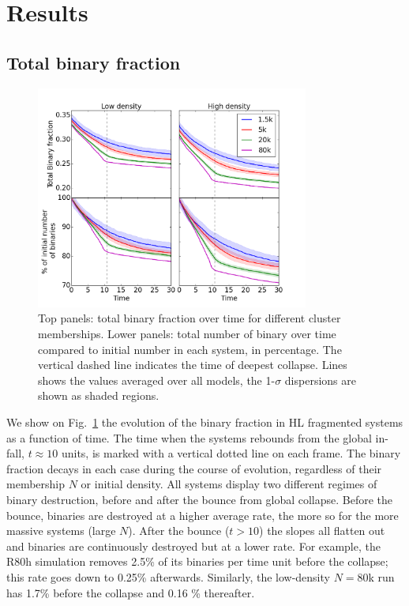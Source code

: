 \section{Results}


\subsection{Total binary fraction}



\begin{figure}
\begin{center}
\includegraphics[width=0.8\textwidth]{Figures/6_TotBinFrac_vs_time_dispersion}
\caption[Evolution of the total binary fraction and percentage of initial population]{ Top panels: total binary fraction over time for different cluster memberships. Lower panels: total number of binary over time compared to initial number in each system, in percentage. The vertical dashed line indicates the time of deepest collapse. Lines shows the values averaged over all models, the 1-$\sigma$ dispersions are shown as shaded regions. }
\label{Fig:6_TotBinFrac}
\end{center}
\end{figure}

We show on Fig.~\ref{Fig:6_TotBinFrac} the evolution of the binary fraction in HL fragmented systems as a function of time. The time when the systems rebounds from the global in-fall, $t \approx 10$ units, is marked with a vertical dotted line on each frame. The binary fraction decays in each case during the course of evolution, regardless of their membership $N$ or initial density. 
All systems display two different regimes of binary destruction, before and after the bounce from global collapse. Before the bounce, binaries are destroyed at a higher average rate, the more so for the more massive systems (large $N$). 
After the bounce ($t > 10$) the slopes all flatten out and binaries are continuously destroyed but at a lower rate. For example, the R80h simulation removes 2.5\% of its binaries per time unit before the collapse; this rate goes down to 0.25\% afterwards. Similarly, the low-density $N = 80$k run has  1.7\% before the collapse and 0.16 \% thereafter.


